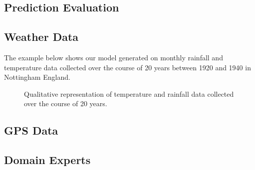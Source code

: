 \subsection{Prediction Evaluation}

\subsection{Weather Data}
\label{sec:experiments-weather}

The example below shows our model generated on monthly rainfall and temperature data
collected over the course of 20 years between 1920 and 1940 in Nottingham England.

\begin{figure}[h!]
	\centering
	\caption{Qualitative representation of temperature and rainfall data collected over the course of 20 years.}
	\label{fig:example-weather}
\end{figure}

\subsection{GPS Data}

\subsection{Domain Experts}